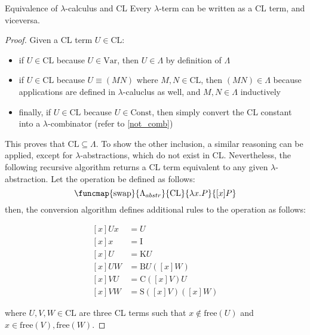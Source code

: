 \documentclass[a4paper, 12pt]{report}
\begin{document}
    \begin{framedthm}{Equivalence of $\lambda$-calculus and CL}
        Every $\lambda$-term can be written as a CL term, and viceversa.
    \end{framedthm}

    \begin{proof}
        Given a CL term $U \in \mathrm{CL}$:

        \begin{itemize}
            \item if $U \in \mathrm{CL}$ because $U \in \mathrm{Var}$, then $U \in \Lambda$ by definition of $\Lambda$
            \item if $U \in \mathrm{CL}$ because $U \equiv (MN)$ where $M, N \in \mathrm{CL}$, then $(MN) \in \Lambda$ because applications are defined in $\lambda$-caluclus as well, and $M, N \in \Lambda$ inductively
            \item finally, if $U \in \mathrm{CL}$ because $U \in \mathrm{Const}$, then simply convert the CL constant into a $\lambda$-combinator (refer to \cref{not_comb})
        \end{itemize}

        This proves that $\mathrm{CL} \subseteq \Lambda$. To show the other inclusion, a similar reasoning can be applied, except for $\lambda$-abstractions, which do not exist in CL. Nevertheless, the following recursive algorithm returns a CL term equivalent to any given $\lambda$-abstraction. Let the  operation be defined as follows: $$\funcmap{\mathrm{swap}}{\Lambda_{abstr}}{\mathrm{CL}}{\lambda x. P}{[x]P}$$ then, the conversion algorithm defines additional rules to the  operation as follows:

        \begin{equation*}
            \begin{split}
                [x]Ux &= U \\
                [x]x &= \mathrm I \\
                [x]U &= \mathrm KU \\
                [x]UW &= \mathrm BU([x]W) \\
                [x]VU &= \mathrm C([x]V)U \\
                [x]VW &= \mathrm S([x]V)([x]W)
            \end{split}
        \end{equation*}

        where $U, V, W \in \mathrm{CL}$ are three CL terms such that $x \notin \mathrm{free}(U)$ and $x \in \mathrm{free}(V), \mathrm{free}(W)$.
    \end{proof}
\end{document}
